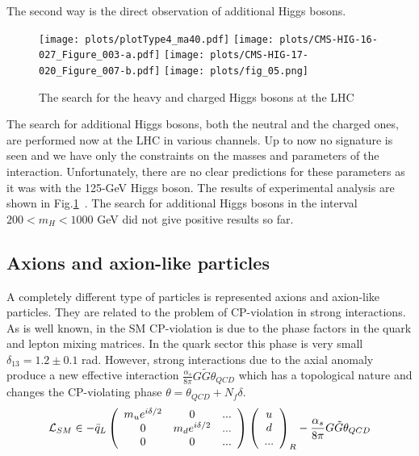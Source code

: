 \documentclass{cernyrep}
\begin{document}
The second way is the direct observation of additional Higgs bosons. 

\begin{figure}[htb]
\begin{center}
\leavevmode
\texttt{[image: plots/plotType4\_ma40.pdf]}
\texttt{[image: plots/CMS-HIG-16-027\_Figure\_003-a.pdf]}
\texttt{[image: plots/CMS-HIG-17-020\_Figure\_007-b.pdf]}
\texttt{[image: plots/fig\_05.png]}
\end{center}
\caption{The search for the heavy and charged Higgs bosons at the LHC}
\label{chargedH}
\end{figure}

The search for additional Higgs bosons, both the neutral and the charged ones, are performed now at the LHC in various channels. Up to now no signature is seen and we have only the constraints on the masses and parameters of the interaction. Unfortunately, there are no clear predictions for these parameters as it was with the 125-GeV Higgs boson. The results of experimental analysis are shown in Fig.\ref{chargedH}~\cite{chargedH}. The search for additional Higgs bosons in the interval $200 < m_H < 1000$ GeV did not give positive results so far.

\iffalse %
 \begin{figure}[ht]
\begin{center}
\leavevmode
\texttt{[image: plots/chargedH]}
\end{center}
\caption{The search for the heavy and charged Higgs bosons at the LHC}
\label{chargedH}
\end{figure}
\fi

\subsection{Axions and axion-like particles}

A completely different type of particles is represented axions and axion-like particles. They are related to the problem of CP-violation in strong interactions. As is well known, in the SM CP-violation is due to the phase factors in the quark and lepton mixing matrices. In the quark sector this phase is very small $\delta_{13}=1.2\pm 0.1$ rad. However, strong interactions due to the axial anomaly produce a new effective interaction $\frac{\alpha_s}{8\pi} G \tilde G \theta_{QCD}$ which has a topological nature and changes the CP-violating phase $\theta=\theta_{QCD}+N_f \delta$. 
$${\cal L}_{SM} \in -\bar q_L\left( \begin{array}{ccc}m_u e^{i\delta/2} & 0& ...\\
0 &m_d e^{i\delta/2} & ...\\
0 & 0& ...\end{array} \right) \left(\begin{array}{c}u \\d\\ ...\end{array}\right)_R-\frac{\alpha_s}{8\pi}G\tilde G \theta_{QCD}$$
\end{document}

